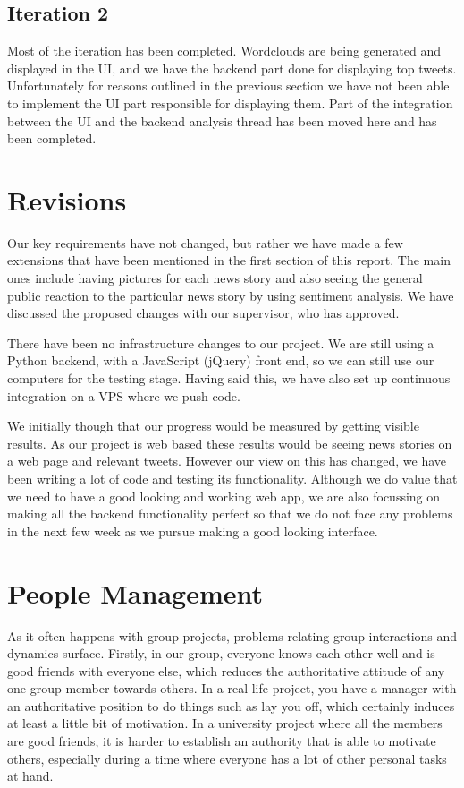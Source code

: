 \documentclass[a4paper,12pt]{article}
\begin{document}
	\subsection{Iteration 2}
	Most of the iteration has been completed. Wordclouds are being generated and displayed in the UI, and we have the backend part done for displaying top tweets. Unfortunately for reasons outlined in the previous section we have not been able to implement the UI part responsible for displaying them. Part of the integration between the UI and the backend analysis thread has been moved here and has been completed.
	
	\section{Revisions}
	
	Our key requirements have not changed, but rather we have made a few extensions that have been mentioned in the first section of this report. The main ones include having pictures for each news story and also seeing the general public reaction to the particular news story by using sentiment analysis. We have discussed the proposed changes with our supervisor, who has approved.
  
  There have been no infrastructure changes to our project. We are still using a Python backend, with a JavaScript (jQuery) front end, so we can still use our computers for the testing stage. Having said this, we have also set up continuous integration on a VPS where we push code.
  
  We initially though that our progress would be measured by getting visible results. As our project is web based these results would be seeing news stories on a web page and relevant tweets. However our view on this has changed, we have been writing a lot of code and testing its functionality. Although we do value that we need to have a good looking and working web app, we are also focussing on making all the backend functionality perfect so that we do not face any problems in the next few week as we pursue making a good looking interface.
	
	
	
	\section{People Management}
	
	As it often happens with group projects, problems relating group interactions and dynamics surface. Firstly, in our group, everyone knows each other well and is good friends with everyone else, which reduces the authoritative attitude of any one group member towards others. In a real life project, you have a manager with an authoritative position to do things such as lay you off, which certainly induces at least a little bit of motivation. In a university project where all the members are good friends, it is harder to establish an authority that is able to motivate others, especially during a time where everyone has a lot of other personal tasks at hand.
	
\end{document}
